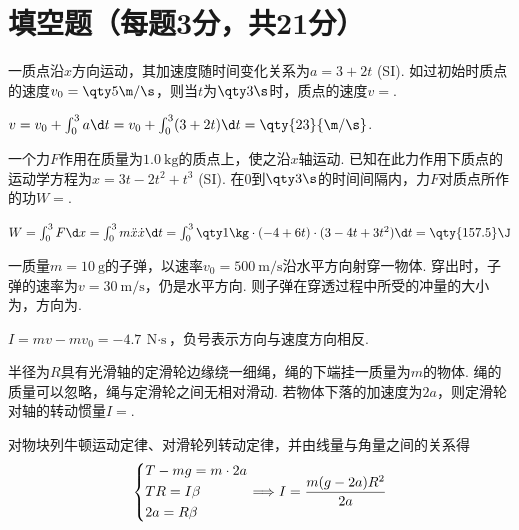 \section{填空题（每题3分，共21分）}

\begin{problem}
    一质点沿$x$方向运动，其加速度随时间变化关系为$a=3+2t$ (SI). 如过初始时质点的速度$v_0=\qty5{\m/\s}$，则当$t$为$\qty3{\s}$时，质点的速度$v=$.
\end{problem}
\begin{solution}
    $v=v_0+\int_0^3a\d t=v_0+\int_0^3(3+2t)\d t=\qty{23}{\m/\s}$.
\end{solution}

\begin{problem}
    一个力$F$作用在质量为$\qty{1.0}\kg$的质点上，使之沿$x$轴运动. 已知在此力作用下质点的运动学方程为$x=3t-2t^2+t^3$ (SI). 在$0$到$\qty3{\s}$的时间间隔内，力$F$对质点所作的功$W=$.
\end{problem}
\begin{solution}
    $W=\int_0^3{F\d x}=\int_0^3{m\ddot x\dot x\d t}=\int_0^3\qty1\kg\cdot(-4+6t)\cdot(3-4t+3t^2)\d t=\qty{157.5}\J$
\end{solution}

\begin{problem}
    一质量$m=\qty{10}\g$的子弹，以速率$v_0=\qty{500}{\m/\s}$沿水平方向射穿一物体. 穿出时，子弹的速率为$v=\qty{30}{\m/\s}$，仍是水平方向. 则子弹在穿透过程中所受的冲量的大小为，方向为.
\end{problem}
\begin{solution}
    $I=mv-mv_0=\qty{-4.7}{\N\cdot\s}$，负号表示方向与速度方向相反.
\end{solution}

\begin{problem}
    半径为$R$具有光滑轴的定滑轮边缘绕一细绳，绳的下端挂一质量为$m$的物体. 绳的质量可以忽略，绳与定滑轮之间无相对滑动. 若物体下落的加速度为$2a$，则定滑轮对轴的转动惯量$I=$.
\end{problem}
\begin{solution}
    对物块列牛顿运动定律、对滑轮列转动定律，并由线量与角量之间的关系得
    \[
    \begin{dcases}
        T-mg=m\cdot 2a\\
        TR=I\beta\\
        2a=R\beta
    \end{dcases}\Longrightarrow I=\frac{m(g-2a)R^2}{2a}
    \]
\end{solution}

